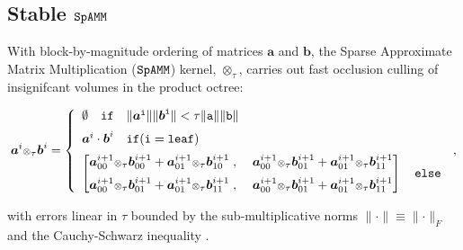 \documentclass[letterpaper,twocolumn,amsmath,amsfont,amssymb,english,aps,jcp,preprintnumbers,groupaddress,nofootinbib,tightenlines]{revtex4}
\newcommand{\mat}[1]{\boldsymbol{#1}}
\newcommand{\ot}{ {\scriptstyle \otimes}_{ \tau } }
\begin{document}
\subsection{Stable $\tt SpAMM$}

With block-by-magnitude ordering of matrices $\mat{a}$ and $\mat{b}$, 
the Sparse Approximate Matrix Multiplication ($\tt SpAMM$) kernel,  $\ot$, carries out fast 
occlusion culling of insignifcant volumes in the product octree:
\begin{widetext}
\begin{equation}
\mat{a}^{i} \ot \mat{b}^{i} = 
\left\{
        \begin{array}{ll}
                 \emptyset \quad \tt{if}\quad \lVert \mat{a}^i \rVert \lVert \mat{b}^i \rVert < \tau \lVert a \rVert \lVert b \rVert \\[0.2cm]
                 \mat{a} ^i \cdot \mat{b}^i \quad  \tt{if}(i=\tt{leaf}) \\[0.2cm]
\begin{bmatrix} \mat{a}^{i+1}_{00} \ot \mat{b}^{i+1}_{00} +\mat{a}^{i+1}_{01} \ot \mat{b}^{i+1}_{10} \; , \; &
                \mat{a}^{i+1}_{00} \ot \mat{b}^{i+1}_{01} +\mat{a}^{i+1}_{01} \ot \mat{b}^{i+1}_{11}  \\[0.2cm] 
                \mat{a}^{i+1}_{00} \ot \mat{b}^{i+1}_{01} +\mat{a}^{i+1}_{01} \ot \mat{b}^{i+1}_{11} \; , \; & 
                \mat{a}^{i+1}_{00} \ot \mat{b}^{i+1}_{01} +\mat{a}^{i+1}_{01} \ot \mat{b}^{i+1}_{11}   
\end{bmatrix}  \quad \tt{else}
                \end{array}
              \right.  \, ,
\end{equation}
\end{widetext}
with errors linear in $\tau$ 
bounded by the sub-multiplicative norms $\lVert \cdot \rVert \equiv \lVert \cdot \rVert_F$ and the Cauchy-Schwarz inequality \cite{kahan,}.
\end{document}

